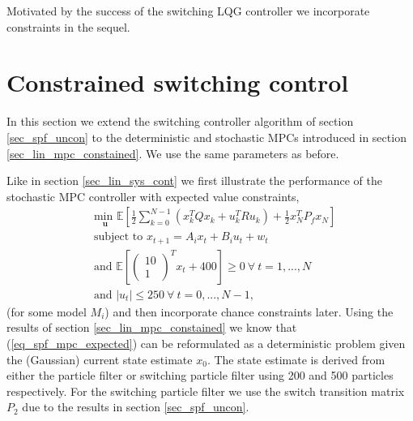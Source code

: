 Motivated by the success of the switching LQG controller we incorporate constraints in the sequel.

\section{Constrained switching control} 
In this section we extend the switching controller algorithm of section \ref{sec_spf_uncon} to the deterministic and stochastic MPCs introduced in section \ref{sec_lin_mpc_constained}. We use the same parameters as before.

Like in section \ref{sec_lin_sys_cont} we first illustrate the performance of the stochastic MPC controller with expected value constraints,
\begin{equation}
\begin{aligned}
&\underset{\mathbf{u}}{\text{min }} \mathbb{E}\left[ \frac{1}{2}\sum_{k=0}^{N-1} \left( x_k^TQx_k + u_k^TRu_k \right) + \frac{1}{2}x_N^TP_fx_N \right] \\
& \text{subject to } x_{t+1}=A_ix_t+B_iu_t + w_t\\
& \text{and } \mathbb{E}[\begin{pmatrix}
10 \\ 1
\end{pmatrix}^Tx_t + 400] \geq 0 ~\forall ~t=1,...,N \\
& \text{and } |u_t| \leq 250 ~\forall ~t=0,...,N-1,
\end{aligned}
\label{eq_spf_mpc_expected}
\end{equation} 
(for some model $M_i$) and then incorporate chance constraints later. Using the results of section \ref{sec_lin_mpc_constained} we know that (\ref{eq_spf_mpc_expected}) can be reformulated as a deterministic problem given the (Gaussian) current state estimate $x_0$. The state estimate is derived from either the particle filter or switching particle filter using 200 and 500 particles respectively. For the switching particle filter we use the switch transition matrix $P_2$ due to the results in section \ref{sec_spf_uncon}.


